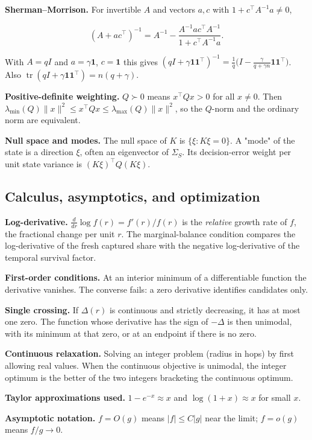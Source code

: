 \textbf{Sherman--Morrison.} For invertible $A$ and vectors $a,c$ with $1+c^\top A^{-1}a\neq0$,

\[
(A+ac^\top)^{-1}=A^{-1}-\frac{A^{-1}ac^\top A^{-1}}{1+c^\top A^{-1}a}.
\]

  With $A=qI$ and $a=\gamma\mathbf 1$, $c=\mathbf 1$ this gives $(qI+\gamma\mathbf 1\mathbf 1^\top)^{-1}=\frac1q\big(I-\frac{\gamma}{q+\gamma n}\mathbf 1\mathbf 1^\top\big)$. Also $\operatorname{tr}(qI+\gamma\mathbf 1\mathbf 1^\top)=n(q+\gamma)$.

\textbf{Positive-definite weighting.} $Q\succ0$ means $x^\top Qx>0$ for all $x\neq0$. Then $\lambda_{\min}(Q)\|x\|^2\le x^\top Qx\le\lambda_{\max}(Q)\|x\|^2$, so the $Q$-norm and the ordinary norm are equivalent.

\textbf{Null space and modes.} The null space of $K$ is $\{\xi:K\xi=0\}$. A "mode" of the state is a direction $\xi$, often an eigenvector of $\Sigma_S$. Its decision-error weight per unit state variance is $(K\xi)^\top Q(K\xi)$.

\subsection{Calculus, asymptotics, and optimization}
\label{app:toolkit-7}
\textbf{Log-derivative.} $\frac{d}{dr}\log f(r)=f'(r)/f(r)$ is the \emph{relative} growth rate of $f$, the fractional change per unit $r$. The marginal-balance condition compares the log-derivative of the fresh captured share with the negative log-derivative of the temporal survival factor.

\textbf{First-order conditions.} At an interior minimum of a differentiable function the derivative vanishes. The converse fails: a zero derivative identifies candidates only.

\textbf{Single crossing.} If $\Delta(r)$ is continuous and strictly decreasing, it has at most one zero. The function whose derivative has the sign of $-\Delta$ is then unimodal, with its minimum at that zero, or at an endpoint if there is no zero.

\textbf{Continuous relaxation.} Solving an integer problem (radius in hops) by first allowing real values. When the continuous objective is unimodal, the integer optimum is the better of the two integers bracketing the continuous optimum.

\textbf{Taylor approximations used.} $1-e^{-x}\approx x$ and $\log(1+x)\approx x$ for small $x$.

\textbf{Asymptotic notation.} $f=O(g)$ means $|f|\le C|g|$ near the limit; $f=o(g)$ means $f/g\to0$.

